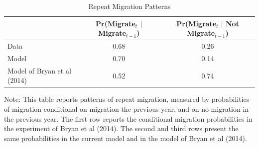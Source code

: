 \documentclass[12pt,pdftex]{article}
\renewcommand{\arraystretch}{1.1}
\begin{document}
\begin{table}[!h]
\small
\setlength {\tabcolsep}{3.5mm}
\renewcommand{\arraystretch}{1.2}
\caption{Repeat Migration Patterns \label{ta:repeat_migration_model_data}}
\begin{center}
\begin{tabular}{l c c}
\hline
\hline
 & Pr(Migrate$_t$ $|$ Migrate$_{t-1}$) & Pr(Migrate$_t$ $|$ Not Migrate$_{t-1}$)  \\
\hline
Data & 0.68  & 0.26  \\
Model & 0.70  & 0.14  \\
Model of Bryan et al (2014) & 0.52 & 0.74 \\
\hline
\hline
\end{tabular}
\parbox[c]{6.8in}{%
{\footnotesize  \vspace{0.3cm} Note: This table reports patterns of repeat migration, measured by probabilities of migration conditional on migration the previous year, and on no migration in the previous year. The first row reports the conditional migration probabilities in the experiment of Bryan et al (2014). The second and third rows present the same probabilities in the current model and in the model of Bryan et al (2014).}
}
\end{center}
\end{table}

\newpage
\clearpage
\end{document}
